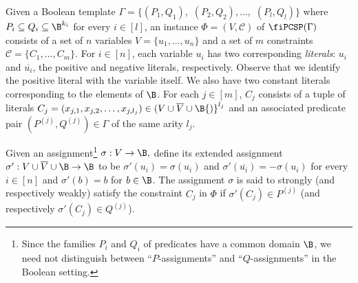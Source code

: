 \begin{definition} {Given a Boolean template $\Gamma=\{(P_1,Q_1),$ $(P_2,Q_2),\ldots,$ $(P_l,Q_l)\}$ where $P_i \subseteq Q_i \subseteq \B^{k_i}$ for every $i \in [l]$, an instance $\Phi=(V,\mathcal{C})$ of $\fiPCSP(\Gamma)$ consists of a set of $n$ variables $V = \{u_1, \hdots, u_n\}$ and a set of $m$ constraints $\mathcal{C} = \{C_1, \hdots, C_m\}$. For $i \in [n]$, each variable $u_i$ has two corresponding \emph{literals}: $u_i$ and $\overline{u_i}$, the positive and negative literals, respectively. {Observe that we identify the positive literal with the variable itself.} We also have two constant literals corresponding to the elements of $\B$. For each $j \in [m]$, $C_j$ consists} of a tuple of literals $C_j = (x_{j,1}, x_{j,2}, \ldots, x_{j,{l_j}}) \in {(}V\cup \overline{V} \cup \B{)}^{l_j}$ and an associated predicate pair $(P^{(j)},Q^{(j)}) \in \Gamma$ of the same arity $l_j$. 

Given an assignment\footnote{{Since the families $P_i$ and $Q_i$ of predicates have a common domain $\B$, we need not distinguish between ``$P$-assignments'' and ``$Q$-assignments'' in the Boolean setting.}} $\sigma : V \rightarrow \B,$ {define its extended assignment $\sigma' : V \cup \overline{V} \cup \B \rightarrow \B$ to be} $\sigma'(u_i)=\sigma(u_i)$ and $\sigma'(\overline{u_i})=-\sigma(u_i)$ for every $i \in [n]$ {and $\sigma'(b) = b$ for $b \in \B$}. The assignment $\sigma$ is said to strongly (and {respectively} weakly) satisfy the constraint $C_j$ in $\Phi$ if $\sigma'(C_j) \in P^{(j)}$ (and {respectively} $\sigma'(C_j) \in Q^{(j)}$). 
\end{definition}
